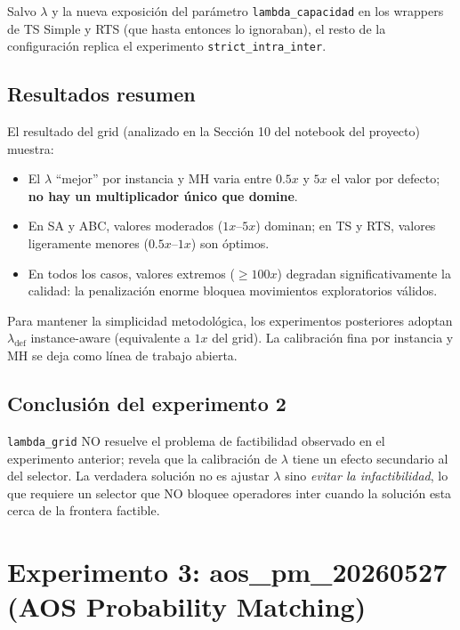 \documentclass[11pt,a4paper]{article}
\theoremstyle{definition}
\theoremstyle{remark}
\begin{document}
Salvo $\lambda$ y la nueva exposición del parámetro
\texttt{lambda\_capacidad} en los wrappers de TS Simple y RTS (que
hasta entonces lo ignoraban), el resto de la configuración replica el
experimento \texttt{strict\_intra\_inter}.

\subsection{Resultados resumen}

El resultado del grid (analizado en la Sección 10 del notebook del
proyecto) muestra:

\begin{itemize}
\item El $\lambda$ ``mejor'' por instancia y MH varia entre $0.5x$ y
  $5x$ el valor por defecto; \textbf{no hay un multiplicador único que
  domine}.
\item En SA y ABC, valores moderados ($1x$--$5x$) dominan; en TS y RTS,
  valores ligeramente menores ($0.5x$--$1x$) son óptimos.
\item En todos los casos, valores extremos ($\ge 100x$) degradan
  significativamente la calidad: la penalización enorme bloquea
  movimientos exploratorios válidos.
\end{itemize}

Para mantener la simplicidad metodológica, los experimentos
posteriores adoptan $\lambda_{\text{def}}$ instance-aware
(equivalente a $1x$ del grid). La calibración fina por instancia y MH
se deja como línea de trabajo abierta.

\subsection{Conclusión del experimento 2}

\texttt{lambda\_grid} NO resuelve el problema de factibilidad observado
en el experimento anterior; revela que la calibración de $\lambda$
tiene un efecto secundario al del selector. La verdadera solución no
es ajustar $\lambda$ sino \emph{evitar la infactibilidad}, lo que
requiere un selector que NO bloquee operadores inter cuando la solución
esta cerca de la frontera factible.

\section{Experimento 3: aos\_pm\_20260527 (AOS Probability Matching)}
\label{sec:exp-aos}
\end{document}
